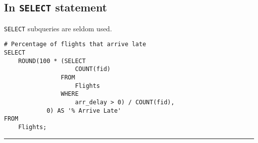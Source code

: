 \documentclass{article}
\begin{document}
  
  
  
  
  
  
  
  
  
  




\subsection*{In \texttt{SELECT} statement}

\texttt{SELECT} subqueries are seldom used.  

 
\begin{lstlisting}[frame=single]     
# Percentage of flights that arrive late 
SELECT 
    ROUND(100 * (SELECT 
                    COUNT(fid)
                FROM
                    Flights
                WHERE
                    arr_delay > 0) / COUNT(fid),
            0) AS '% Arrive Late'
FROM
    Flights;
\end{lstlisting}   


\hspace{-0.5cm}\rule[-0.101in]{\textwidth}{0.0025in}
    
    
  
  



 
\end{document}
